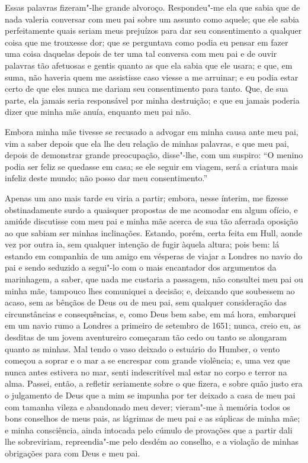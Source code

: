 Essas palavras fizeram"-lhe grande alvoroço. Respondeu"-me ela que sabia
que de nada valeria conversar com meu pai sobre um assunto como aquele;
que ele sabia perfeitamente quais seriam meus prejuízos para dar seu
consentimento a qualquer coisa que me trouxesse dor; que se perguntava
como podia eu pensar em fazer uma coisa daquelas depois de ter uma tal
conversa com meu pai e de ouvir palavras tão afetuosas e gentis quanto
as que ela sabia que ele usara; e que, em suma, não haveria quem me
assistisse caso viesse a me arruinar; e eu podia estar certo de que eles
nunca me dariam seu consentimento para tanto. Que, de sua parte, ela
jamais seria responsável por minha destruição; e que eu jamais poderia
dizer que minha mãe anuía, enquanto meu pai não.

Embora minha mãe tivesse se recusado a advogar em minha causa ante meu
pai, vim a saber depois que ela lhe deu relação de minhas palavras, e
que meu pai, depois de demonstrar grande preocupação, disse"-lhe, com um
suspiro: ``O menino podia ser feliz se quedasse em casa; se ele seguir
em viagem, será a criatura mais infeliz deste mundo; não posso dar meu
consentimento.''

Apenas um ano mais tarde eu viria a partir; embora, nesse ínterim, me
fizesse obstinadamente surdo a quaisquer propostas de me acomodar em
algum ofício, e amiúde discutisse com meu pai e minha mãe acerca de sua
tão aferrada oposição ao que sabiam ser minhas inclinações. Estando,
porém, certa feita em Hull, aonde vez por outra ia, sem qualquer
intenção de fugir àquela altura; pois bem: lá estando em companhia de um
amigo em vésperas de viajar a Londres no navio do pai e sendo seduzido a
segui"-lo com o mais encantador dos argumentos da marinhagem, a saber,
que nada me custaria a passagem, não consultei meu pai ou minha mãe,
tampouco lhes comuniquei a decisão; e, deixando que soubessem ao acaso,
sem as bênçãos de Deus ou de meu pai, sem qualquer consideração das
circunstâncias e consequências, e, como Deus bem sabe, em má hora,
embarquei em um navio rumo a Londres a primeiro de setembro de 1651;
nunca, creio eu, as desditas de um jovem aventureiro começaram tão cedo
ou tanto se alongaram quanto as minhas. Mal tendo o vaso deixado o
estuário do Humber, o vento começou a soprar e o mar a se encrespar com
grande violência; e, uma vez que nunca antes estivera no mar, senti
indescritível mal estar no corpo e terror na alma. Passei, então, a
refletir seriamente sobre o que fizera, e sobre quão justo era o
julgamento de Deus que a mim se impunha por ter deixado a casa de meu
pai com tamanha vileza e abandonado meu dever; vieram"-me à memória todos
os bons conselhos de meus pais, as lágrimas de meu pai e as súplicas de
minha mãe; e minha consciência, ainda intocada pelo cúmulo de provações
que a partir dali lhe sobreviriam, repreendia"-me pelo desdém ao
conselho, e a violação de minhas obrigações para com Deus e meu pai.

